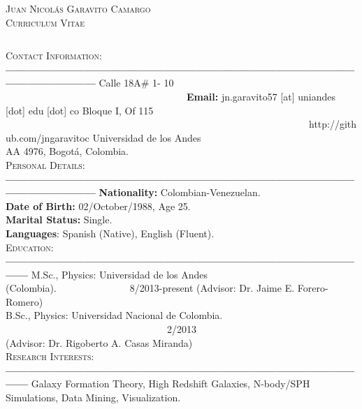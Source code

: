 \documentclass[letterpaper]{article}
\begin{document}
\begin{center}
\textsc{\LARGE Juan Nicol\'as Garavito Camargo}\\
\textsc{\large Curriculum Vitae}\\
\end{center}

$    $


\textsc{\Large Contact Information:}\\
{\bf---------------------------------------------------------------------------------------------------------------------}
Calle 18A\# 1- 10 \indent \ \ \ \ \ \ \ \ \ \ \ \ \ \ \ \ \ \ \ \ \ \ \ \ \ \ \ \ \ \ \ \ \ \  \ \  \ {\bf Email:} jn.garavito57 [at] uniandes [dot] edu [dot] co       
Bloque I, Of 115 \indent \ \ \ \ \ \ \ \ \ \ \ \ \ \ \ \ \ \ \ \ \ \ \ \ \ \ \ \ \ \ \ \ \ \ \ \ \ \ \ \ \ \ \ \ \ \ \ \ \ \ \ \ \ \ \ \ \ \ \ \ \ \    http://github.com/jngaravitoc            
Universidad de los Andes\\
AA 4976, Bogot\'a, Colombia.\\
	
\indent \textsc{\Large Personal Details:}\\
{\bf---------------------------------------------------------------------------------------------------------------------}
{\bf \large Nationality:} \large Colombian-Venezuelan.\\
{\bf Date of Birth:} 02/October/1988, Age 25.\\
{\bf Marital Status:} Single.\\
{\bf Languages}: Spanish (Native), English (Fluent).\\

\textsc{\Large Education:}\\
{\bf---------------------------------------------------------------------------------------------------}
M.Sc., Physics: Universidad de los Andes (Colombia).\indent \ \ \ \ \ \ \ \ \ \ \ \ \ \ \  8/2013-present
(Advisor: Dr. Jaime E. Forero-Romero)\\
B.Sc., Physics: Universidad Nacional de Colombia. \indent \ \ \ \ \ \ \ \ \ \ \ \ \ \ \ \ \ \ \ \ \ \ \ \ \ \ \ \ \ \ \ \ \ 2/2013\\
(Advisor: Dr. Rigoberto A. Casas Miranda)\\

\textsc{\Large Research Interests:}\\
{\bf---------------------------------------------------------------------------------------------------}
Galaxy Formation Theory, High Redshift Galaxies, N-body/SPH Simulations, Data Mining, Visualization.\\
\end{document}
